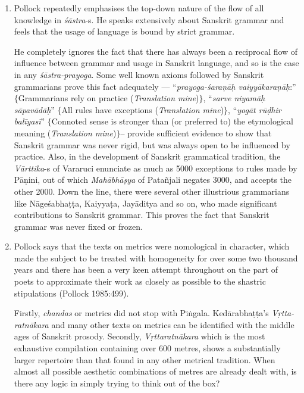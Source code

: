 \begin{enumerate}
\item Pollock repeatedly emphasises the top-down nature of the flow of all knowledge in {\it śāstra}-s. He speaks extensively about Sanskrit grammar and feels that the usage of language is bound by strict grammar. 

He completely ignores the fact that there has always been a reciprocal flow of influence between grammar and usage in Sanskrit language, and so is the case in any \textit{śāstra-prayoga}. Some well known axioms followed by Sanskrit grammarians prove this fact adequately --- ``\textit{prayoga-śaraṇāḥ vaiyyākaraṇāḥ}:'' $\{$Grammarians rely on practice (\textit{Translation mine})$\}$, ``\textit{sarve niyamāḥ sāpavādāḥ}'' $\{$All rules have exceptions (\textit{Translation mine})$\}$, ``\textit{yogāt rūḍhir balīyasī}'' $\{$Connoted sense is stronger than (or preferred to) the etymological meaning (\textit{Translation mine})$\}$-- provide sufficient evidence to show that Sanskrit grammar was never rigid, but was always open to be influenced by practice. Also, in the development of Sanskrit grammatical tradition, the  {\it Vārttika}-s of Vararuci enunciate as much as 5000 exceptions to rules made by Pāṇini, out of which {\it Mahābhāṣya} of Patañjali negates 3000, and accepts the other 2000. Down the line, there were several other illustrious grammarians like Nāgeśabhaṭṭa, Kaiyyaṭa, Jayāditya and so on, who made significant contributions to Sanskrit grammar. This proves the fact that Sanskrit grammar was never fixed or frozen.

\item Pollock says that the texts on metrics were nomological in character, which made the subject to be treated with homogeneity for over some two thousand years and there has been a very keen attempt throughout on the part of poets to approximate their work as closely as possible to the shastric stipulations (Pollock 1985:499). 

Firstly, {\it chandas} or metrics did not stop with Piṅgala. Kedārabhaṭṭa's \textit{Vṛtta-ratnākara} and many other texts on metrics can be identified with the middle ages of Sanskrit prosody. Secondly, {\it Vṛttaratnākara} which is the most exhaustive compilation containing over 600 metres,  shows a substantially larger repertoire than that found in any other metrical tradition. When almost all possible aesthetic combinations of metres are already dealt with, is there any logic in simply trying to think out of the box?  


\end{enumerate}
